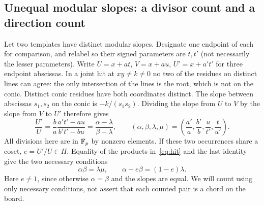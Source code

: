 \subsection{Unequal modular slopes: a divisor count and a direction count}
Let two templates have distinct modular slopes. Designate one endpoint of each for comparison, and relabel so their signed parameters are $t,t'$ (not necessarily the lesser parameters). Write $U=x+at$, $V=x+au$, $U'=x+a't'$ for three endpoint abscissas. In a joint hit at $xy\ne k\ne0$ no two of the residues on distinct lines can agree: the only intersection of the lines is the root, which is not on the conic. Distinct conic residues have both coordinates distinct. The slope between abscissas $s_1,s_2$ on the conic is $-k/(s_1s_2)$. Dividing the slope from $U$ to $V$ by the slope from $V$ to $U'$ therefore gives
\[
 \frac{U'}{U}=\frac{b}{a}\frac{a't'-au}{b't'-bu}
 =\frac{\alpha-\lambda}{\beta-\lambda},\qquad
 (\alpha,\beta,\lambda,\mu)=\left(\frac{a'}a,\frac{b'}b,\frac{u}{t'},\frac{t}{u'}\right).
\]
All divisions here are in $\mathbb F_p$ by nonzero elements. If these two occurrences share a coset, $e=U'/U\in H$. Equality of the products in~\eqref{eq:hit} and the last identity give the two necessary conditions
\begin{equation}\label{eq:ABCD}
 \alpha\beta=\lambda\mu,\qquad \alpha-e\beta=(1-e)\lambda.
\end{equation}
Here $e\ne1$, since otherwise $\alpha=\beta$ and the slopes are equal. We will count using only necessary conditions, not assert that each counted pair is a chord on the board.


